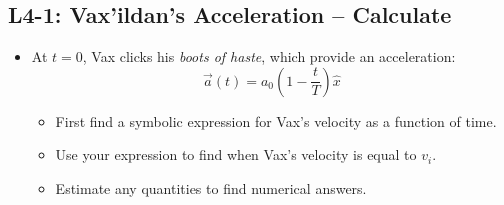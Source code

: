 \documentclass[]{article}
\begin{document}
\begin{PresentSpace}
\vspace{-10pt}
\section*{L4-1: Vax'ildan's Acceleration -- Calculate}
\vspace{-10pt}
\begin{itemize}
	\item At $t=0$, Vax clicks his \textit{boots of haste}, which provide an acceleration:
	\[
	\vec{a}(t) = a_{0}\left(1-\frac{t}{T}\right)\hat{x}
	\]
	\begin{itemize}
		\item First find a symbolic expression for Vax's velocity as a function of time.
		\item Use your expression to find when Vax's velocity is equal to $v_{i}$.
		\item Estimate any quantities to find numerical answers.
	\end{itemize}
\end{itemize}
\end{PresentSpace}
\newpage
\end{document}
